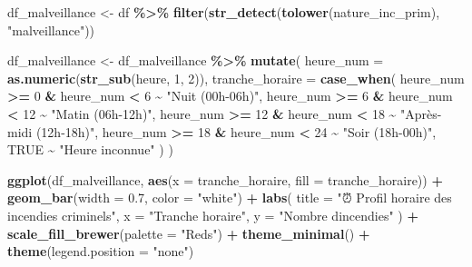 \documentclass[
]{article}
\newenvironment{Shaded}{\begin{snugshade}}{\end{snugshade}}
\newcommand{\AttributeTok}[1]{\textcolor[rgb]{0.13,0.29,0.53}{#1}}
\newcommand{\ConstantTok}[1]{\textcolor[rgb]{0.56,0.35,0.01}{#1}}
\newcommand{\DecValTok}[1]{\textcolor[rgb]{0.00,0.00,0.81}{#1}}
\newcommand{\FloatTok}[1]{\textcolor[rgb]{0.00,0.00,0.81}{#1}}
\newcommand{\FunctionTok}[1]{\textcolor[rgb]{0.13,0.29,0.53}{\textbf{#1}}}
\newcommand{\NormalTok}[1]{#1}
\newcommand{\OtherTok}[1]{\textcolor[rgb]{0.56,0.35,0.01}{#1}}
\newcommand{\SpecialCharTok}[1]{\textcolor[rgb]{0.81,0.36,0.00}{\textbf{#1}}}
\newcommand{\StringTok}[1]{\textcolor[rgb]{0.31,0.60,0.02}{#1}}
\begin{document}
\begin{Shaded}
\begin{Highlighting}[]
\NormalTok{df\_malveillance }\OtherTok{\textless{}{-}}\NormalTok{ df }\SpecialCharTok{\%\textgreater{}\%}
  \FunctionTok{filter}\NormalTok{(}\FunctionTok{str\_detect}\NormalTok{(}\FunctionTok{tolower}\NormalTok{(nature\_inc\_prim), }\StringTok{"malveillance"}\NormalTok{))}

\NormalTok{df\_malveillance }\OtherTok{\textless{}{-}}\NormalTok{ df\_malveillance }\SpecialCharTok{\%\textgreater{}\%}
  \FunctionTok{mutate}\NormalTok{(}
    \AttributeTok{heure\_num =} \FunctionTok{as.numeric}\NormalTok{(}\FunctionTok{str\_sub}\NormalTok{(heure, }\DecValTok{1}\NormalTok{, }\DecValTok{2}\NormalTok{)),}
    \AttributeTok{tranche\_horaire =} \FunctionTok{case\_when}\NormalTok{(}
\NormalTok{      heure\_num }\SpecialCharTok{\textgreater{}=} \DecValTok{0} \SpecialCharTok{\&}\NormalTok{ heure\_num }\SpecialCharTok{\textless{}} \DecValTok{6} \SpecialCharTok{\textasciitilde{}} \StringTok{"Nuit (00h{-}06h)"}\NormalTok{,}
\NormalTok{      heure\_num }\SpecialCharTok{\textgreater{}=} \DecValTok{6} \SpecialCharTok{\&}\NormalTok{ heure\_num }\SpecialCharTok{\textless{}} \DecValTok{12} \SpecialCharTok{\textasciitilde{}} \StringTok{"Matin (06h{-}12h)"}\NormalTok{,}
\NormalTok{      heure\_num }\SpecialCharTok{\textgreater{}=} \DecValTok{12} \SpecialCharTok{\&}\NormalTok{ heure\_num }\SpecialCharTok{\textless{}} \DecValTok{18} \SpecialCharTok{\textasciitilde{}} \StringTok{"Après{-}midi (12h{-}18h)"}\NormalTok{,}
\NormalTok{      heure\_num }\SpecialCharTok{\textgreater{}=} \DecValTok{18} \SpecialCharTok{\&}\NormalTok{ heure\_num }\SpecialCharTok{\textless{}} \DecValTok{24} \SpecialCharTok{\textasciitilde{}} \StringTok{"Soir (18h{-}00h)"}\NormalTok{,}
      \ConstantTok{TRUE} \SpecialCharTok{\textasciitilde{}} \StringTok{"Heure inconnue"}
\NormalTok{    )}
\NormalTok{  )}

\FunctionTok{ggplot}\NormalTok{(df\_malveillance, }\FunctionTok{aes}\NormalTok{(}\AttributeTok{x =}\NormalTok{ tranche\_horaire, }\AttributeTok{fill =}\NormalTok{ tranche\_horaire)) }\SpecialCharTok{+}
  \FunctionTok{geom\_bar}\NormalTok{(}\AttributeTok{width =} \FloatTok{0.7}\NormalTok{, }\AttributeTok{color =} \StringTok{"white"}\NormalTok{) }\SpecialCharTok{+}
  \FunctionTok{labs}\NormalTok{(}
    \AttributeTok{title =} \StringTok{"⏰ Profil horaire des incendies criminels"}\NormalTok{,}
    \AttributeTok{x =} \StringTok{"Tranche horaire"}\NormalTok{,}
    \AttributeTok{y =} \StringTok{"Nombre d\textquotesingle{}incendies"}
\NormalTok{  ) }\SpecialCharTok{+}
  \FunctionTok{scale\_fill\_brewer}\NormalTok{(}\AttributeTok{palette =} \StringTok{"Reds"}\NormalTok{) }\SpecialCharTok{+}
  \FunctionTok{theme\_minimal}\NormalTok{() }\SpecialCharTok{+}
  \FunctionTok{theme}\NormalTok{(}\AttributeTok{legend.position =} \StringTok{"none"}\NormalTok{)}
\end{Highlighting}
\end{Shaded}
\end{document}
